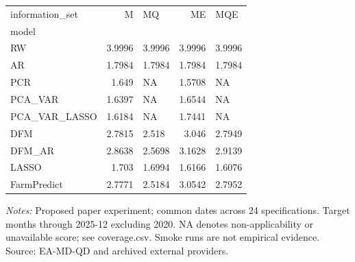 \begin{threeparttable}
\begin{tabular}{lrlrl}
\toprule
information\_set & M & MQ & ME & MQE \\
model &  &  &  &  \\
\midrule
RW & 3.9996 & 3.9996 & 3.9996 & 3.9996 \\
AR & 1.7984 & 1.7984 & 1.7984 & 1.7984 \\
PCR & 1.649 & NA & 1.5708 & NA \\
PCA\_VAR & 1.6397 & NA & 1.6544 & NA \\
PCA\_VAR\_LASSO & 1.6184 & NA & 1.7441 & NA \\
DFM & 2.7815 & 2.518 & 3.046 & 2.7949 \\
DFM\_AR & 2.8638 & 2.5698 & 3.1628 & 2.9139 \\
LASSO & 1.703 & 1.6994 & 1.6166 & 1.6076 \\
FarmPredict & 2.7771 & 2.5184 & 3.0542 & 2.7952 \\
\bottomrule
\end{tabular}
\begin{tablenotes}[flushleft]\footnotesize
\item \textit{Notes:} Proposed paper experiment; common dates across 24 specifications. Target months through 2025-12 excluding 2020. NA denotes non-applicability or unavailable score; see coverage.csv. Smoke runs are not empirical evidence. Source: EA-MD-QD and archived external providers.
\end{tablenotes}
\end{threeparttable}

